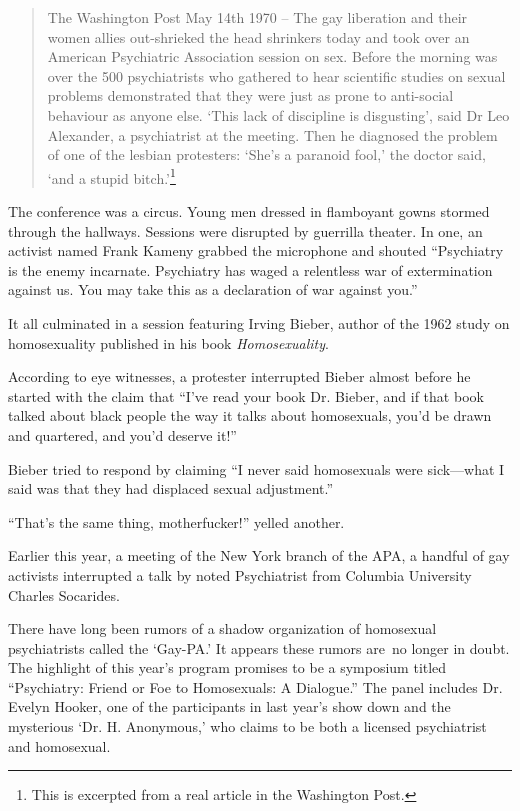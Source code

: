 \begin{refsection}
\begin{quote}

The Washington Post May 14th 1970 -- The gay liberation and their women allies out-shrieked the head shrinkers today and took over an American Psychiatric Association session on sex. Before the morning was over the 500 psychiatrists who gathered to hear scientific studies on sexual problems demonstrated that they were just as prone to anti-social behaviour as anyone else. `This lack of discipline is disgusting', said Dr Leo Alexander, a psychiatrist at the meeting. Then he diagnosed the problem of one of the lesbian protesters: `She's a paranoid fool,' the doctor said, `and a stupid bitch.'\footnote{This is excerpted from a real article in the Washington Post.}
\end{quote}

The conference was a circus. Young men dressed in flamboyant gowns stormed through the hallways. Sessions were disrupted by guerrilla theater. In one, an activist named Frank Kameny grabbed the microphone and shouted ``Psychiatry is the enemy incarnate. Psychiatry has waged a relentless war of extermination against us. You may take this as a declaration of war against you.''

It all culminated in a session featuring Irving Bieber, author of the 1962 study on homosexuality published in his book \emph{Homosexuality}.

According to eye witnesses, a protester interrupted Bieber almost before he started with the claim that ``I've read your book Dr. Bieber, and if that book talked about black people the way it talks about homosexuals, you'd be drawn and quartered, and you'd deserve it!'' ~\citep[p. 200--201]{Clendinen:2013wy} 

Bieber tried to respond by claiming ``I never said homosexuals were sick---what I said was that they had displaced sexual adjustment.'' 

``That's the same thing, motherfucker!'' yelled another.

Earlier this year, a meeting of the New York branch of the APA, a handful of gay activists interrupted a talk by noted Psychiatrist from Columbia University Charles Socarides.

There have long been rumors of a shadow organization of homosexual psychiatrists called the `Gay-PA.' It appears these rumors are no longer in doubt. The highlight of this year's program promises to be a symposium titled ``Psychiatry: Friend or Foe to Homosexuals: A Dialogue.'' The panel includes Dr. Evelyn Hooker, one of the participants in last year's show down and the mysterious `Dr. H. Anonymous,' who claims to be both a licensed psychiatrist and homosexual.


\end{refsection}
